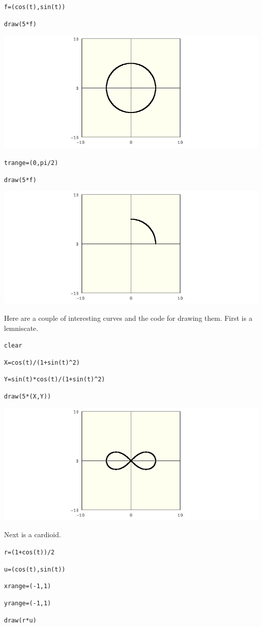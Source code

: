 \medskip
\verb$f=(cos(t),sin(t))$

\verb$draw(5*f)$

\medskip
\begin{center}
\includegraphics[scale=0.4]{circle.png}
\end{center}

\verb$trange=(0,pi/2)$

\verb$draw(5*f)$

\medskip
\begin{center}
\includegraphics[scale=0.4]{circle2.png}
\end{center}

\newpage

\noindent
Here are a couple of interesting curves and the code for drawing them.
First is a lemniscate.

\medskip
\verb$clear$

\verb$X=cos(t)/(1+sin(t)^2)$

\verb$Y=sin(t)*cos(t)/(1+sin(t)^2)$

\verb$draw(5*(X,Y))$

\medskip
\begin{center}
\includegraphics[scale=0.4]{lemniscate.png}
\end{center}

\medskip
\noindent
Next is a cardioid.

\medskip
\verb$r=(1+cos(t))/2$

\verb$u=(cos(t),sin(t))$

\verb$xrange=(-1,1)$

\verb$yrange=(-1,1)$

\verb$draw(r*u)$

